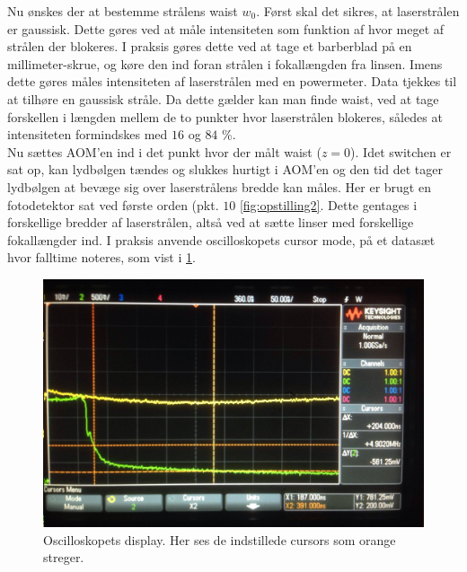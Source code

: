 \documentclass[main]{subfiles}
\begin{document}
Nu ønskes der at bestemme strålens waist $w_0$. Først skal det sikres, at laserstrålen er gaussisk. Dette gøres ved at måle intensiteten som funktion af hvor meget af strålen der blokeres. I praksis gøres dette ved at tage et barberblad på en millimeter-skrue, og køre den ind foran strålen i fokallængden fra linsen. Imens dette gøres måles intensiteten af laserstrålen med en powermeter. Data tjekkes til at tilhøre en gaussisk stråle. Da dette gælder kan man finde waist, ved at tage forskellen i længden mellem de to punkter hvor laserstrålen blokeres, således at  intensiteten formindskes med $16$ og $84$ \%.
\\ Nu sættes AOM'en ind i det punkt hvor der målt waist ($z=0$). Idet switchen er sat op, kan lydbølgen tændes og slukkes hurtigt i AOM'en og den tid det tager lydbølgen at bevæge sig over laserstrålens bredde kan måles. Her er brugt en fotodetektor sat ved første orden (pkt. $10$ \cref{fig:opstilling2}. Dette gentages i forskellige bredder af laserstrålen, altså ved at sætte linser med forskellige fokallængder ind. I praksis anvende oscilloskopets cursor mode, på et datasæt hvor falltime noteres, som vist i  \cref{fig:oscillo}.

\begin{figure}[H]
    \includegraphics[width=\linewidth]{tegninger/osciolo.png}
    \caption{Oscilloskopets display. Her ses de indstillede cursors som orange streger.}
    \label{fig:oscillo}
\end{figure}
\end{document}

